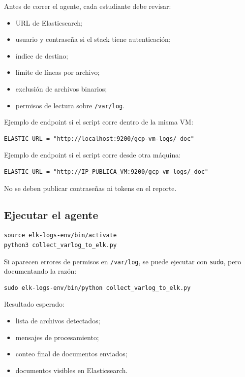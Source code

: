 \documentclass[
  coursetitle={Cómputo Nube y Tecnologías Emergentes},
  coursehours={96},
  coursedate={Verano 2026},
  doctype={Práctica},
  otherlangs={english,french},
  authorname={Lázaro},
  authorsurname={Bustio-Martínez},
  authortitle={PhD},
  role={Profesor Investigador},
  email={lbustio@inaoe.mx},
  phone={5559504000},
  ext={7459},
  institution={Instituto Nacional de Astrofísica, Óptica y Electrónica (INAOE)},
  department={Maestría en Ciencias en Tecnologías de Seguridad},
  address={Luis Enrique Erro 1, Sta. Ma. Tonantzintla, San Andrés Cholula, CP 72840, Puebla, México},
  margin={0.5in}
]{../../lbustio_lecture_notes}
\begin{document}
Antes de correr el agente, cada estudiante debe revisar:

\begin{itemize}
    \item URL de Elasticsearch;
    \item usuario y contraseña si el stack tiene autenticación;
    \item índice de destino;
    \item límite de líneas por archivo;
    \item exclusión de archivos binarios;
    \item permisos de lectura sobre \texttt{/var/log}.
\end{itemize}

Ejemplo de endpoint si el script corre dentro de la misma VM:

\begin{lstlisting}
ELASTIC_URL = "http://localhost:9200/gcp-vm-logs/_doc"
\end{lstlisting}

Ejemplo de endpoint si el script corre desde otra máquina:

\begin{lstlisting}
ELASTIC_URL = "http://IP_PUBLICA_VM:9200/gcp-vm-logs/_doc"
\end{lstlisting}

No se deben publicar contraseñas ni tokens en el reporte.

\subsection{Ejecutar el agente}

\begin{lstlisting}
source elk-logs-env/bin/activate
python3 collect_varlog_to_elk.py
\end{lstlisting}

Si aparecen errores de permisos en \texttt{/var/log}, se puede ejecutar con \texttt{sudo}, pero documentando la razón:

\begin{lstlisting}
sudo elk-logs-env/bin/python collect_varlog_to_elk.py
\end{lstlisting}

Resultado esperado:

\begin{itemize}
    \item lista de archivos detectados;
    \item mensajes de procesamiento;
    \item conteo final de documentos enviados;
    \item documentos visibles en Elasticsearch.
\end{itemize}
\end{document}
